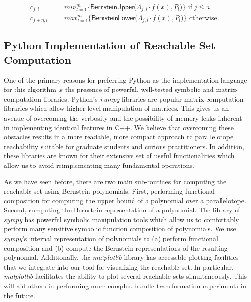 \documentclass[EPiC]{easychair}
\begin{document}
\begin{eqnarray}
c_{j,i} &=& min_{l = 1}^{m} \Big\{ \mathsf{BernsteinUpper}\big(\Lambda_{j,i} \cdot f(x), P_l \big) \Big\} \mbox{ if } j \leq n. \label{eq:upper} \\
c_{j+n,i} &=& max_{l = 1}^{m} \Big\{ \mathsf{BernsteinLower}\big(\Lambda_{j,i} \cdot f(x), P_l \big) \Big\} \mbox{ otherwise. } \label{eq:lower}
\end{eqnarray}

\subsection{Python Implementation of Reachable Set Computation}

One of the primary reasons for preferring Python as the implementation language for this algorithm is the presence of powerful, well-tested symbolic and matrix-computation libraries.
%
Python's \emph{numpy} libraries are popular matrix-computation libraries which allow higher-level manipulation of matrices. This gives us an avenue of overcoming the verbosity and the possibility of memory leaks inherent in implementing identical features in C++. We believe that overcoming these obstacles results in a more readable, more compact approach to parallelotope reachability suitable for graduate students and curious practitioners. In addition, these libraries are known for their extensive set of useful functionalities which allow us to avoid reimplementing many fundamental operations.

%
As we have seen before, there are two main sub-routines for computing the reachable set using Bernstein polynomials.
%
First, performing functional composition for computing the upper bound of a polynomial over a parallelotope.
%
Second, computing the Bernstein representation of a polynomial.
%
The library of \emph{sympy} has powerful symbolic manipulation tools which allow us to comfortably perform many sensitive symbolic function composition of polynomials.
%
We use \emph{sympy}'s internal representation of polynomials to (a) perform functional composition and (b) compute the Bernstein representations of the resulting polynomial.
%
Additionally, the \emph{matplotlib} library has accessible plotting facilities that we integrate into our tool for visualizing the reachable set. In particular, \emph{matplotlib} facilitates the ability to plot several reachable sets simultaneously. This will aid others in performing more complex bundle-transformation experiments in the future. 
\end{document}
